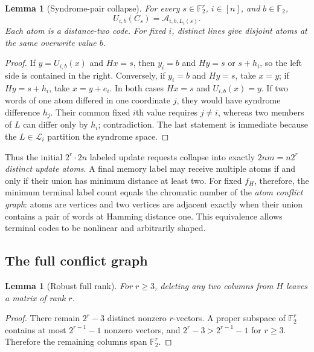 \documentclass[11pt,a4paper]{article}
\newtheorem{lemma}[theorem]{Lemma}
\begin{document}
\begin{lemma}[Syndrome-pair collapse]\label{lem:atoms}
For every $s\in\mathbb F_2^r$, $i\in[n]$, and $b\in\mathbb F_2$,
\[
   U_{i,b}(C_s)=\mathcal A_{i,b,L_i(s)}.
\]
Each atom is a distance-two code. For fixed $i$, distinct lines give disjoint atoms at the same overwrite value $b$.
\end{lemma}
\begin{proof}
If $y=U_{i,b}(x)$ and $Hx=s$, then $y_i=b$ and $Hy=s$ or $s+h_i$, so the left side is contained in the right. Conversely, if $y_i=b$ and $Hy=s$, take $x=y$; if $Hy=s+h_i$, take $x=y+e_i$. In both cases $Hx=s$ and $U_{i,b}(x)=y$. If two words of one atom differed in one coordinate $j$, they would have syndrome difference $h_j$. Their common fixed $i$th value requires $j\ne i$, whereas two members of $L$ can differ only by $h_i$; contradiction. The last statement is immediate because the $L\in\mathscr L_i$ partition the syndrome space.
\end{proof}

Thus the initial $2^r\cdot2n$ labeled update requests collapse into exactly $2nm=n2^r$ \emph{distinct update atoms}. A final memory label may receive multiple atoms if and only if their union has minimum distance at least two. For fixed $f_H$, therefore, the minimum terminal label count equals the chromatic number of the \emph{atom conflict graph}: atoms are vertices and two vertices are adjacent exactly when their union contains a pair of words at Hamming distance one. This equivalence allows terminal codes to be nonlinear and arbitrarily shaped.

\subsection{The full conflict graph}
\begin{lemma}[Robust full rank]\label{lem:rank}
For $r\ge3$, deleting any two columns from $H$ leaves a matrix of rank $r$.
\end{lemma}
\begin{proof}
There remain $2^r-3$ distinct nonzero $r$-vectors. A proper subspace of $\mathbb F_2^r$ contains at most $2^{r-1}-1$ nonzero vectors, and $2^r-3>2^{r-1}-1$ for $r\ge3$. Therefore the remaining columns span $\mathbb F_2^r$.
\end{proof}
\end{document}

